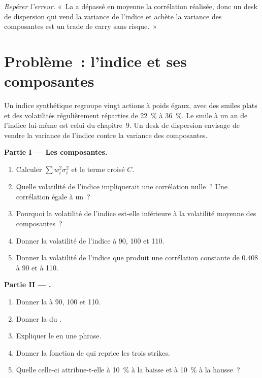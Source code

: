 \begin{exercise}[$\star\star\star$]\label{exo:dv:multi-asset-options:8}
\emph{Repérer l'erreur.} «~La  a dépassé en moyenne la corrélation réalisée, donc un desk de dispersion qui vend la variance de l'indice
et achète la variance des composantes est un trade de carry sans risque.~»
\end{exercise}

\section{Problème~: l'indice et ses composantes}

\begin{problem}\label{pb:dv:multi-asset-options:1}
Un indice synthétique regroupe vingt actions à poids égaux, avec des smiles plats et des volatilités régulièrement réparties de 22~\% à 36~\%. Le
smile à un an de l'indice lui-même est celui du chapitre~9. Un desk de dispersion envisage de vendre la variance de l'indice contre la variance des composantes.

\medskip\noindent\textbf{Partie I --- Les composantes.}
\begin{enumerate}
\item Calculer $\sum w_i^2\sigma_i^2$ et le terme croisé $C$.
\item Quelle volatilité de l'indice impliquerait une corrélation nulle~? Une corrélation égale à un~?
\item Pourquoi la volatilité de l'indice est-elle inférieure à la volatilité moyenne des composantes~?
\item Donner la volatilité de l'indice à 90, 100 et 110.
\item Donner la volatilité de l'indice que produit une corrélation constante de 0.408 à 90 et à 110.
\end{enumerate}

\medskip\noindent\textbf{Partie II --- .}
\begin{enumerate}[resume]
\item Donner la  à 90, 100 et 110.
\item Donner la  du .
\item Expliquer le  en une phrase.
\item Donner la fonction de  qui reprice les trois strikes.
\item Quelle  celle-ci attribue-t-elle à 10~\% à la baisse et à 10~\% à la hausse~?
\end{enumerate}


\end{problem}
